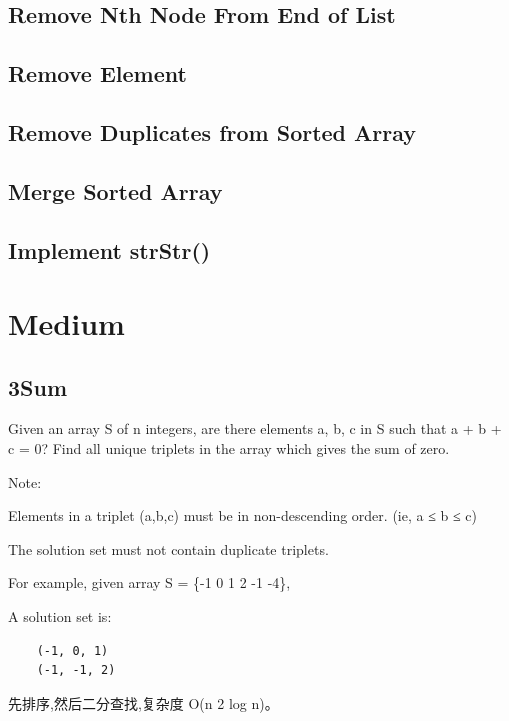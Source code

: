 \documentclass[12pt]{book}
\begin{document}
\subsection{Remove Nth Node From End of List}
\label{sec-15-1-2}
\subsection{Remove Element}
\label{sec-15-1-3}
\subsection{Remove Duplicates from Sorted Array}
\label{sec-15-1-4}
\subsection{Merge Sorted Array}
\label{sec-15-1-5}
\subsection{Implement strStr()}
\label{sec-15-1-6}
\section{Medium}
\label{sec-15-2}
\subsection{3Sum}
\label{sec-15-2-1}
Given an array S of n integers, are there elements a, b, c in S such that a + b + c = 0? Find all unique triplets in the array which gives the sum of zero.

Note:

Elements in a triplet (a,b,c) must be in non-descending order. (ie, a ≤ b ≤ c)

The solution set must not contain duplicate triplets.

For example, given array S = \{-1 0 1 2 -1 -4\},

A solution set is:
\lstset{language=java,label= ,caption= ,numbers=none}
\begin{lstlisting}
    (-1, 0, 1)
    (-1, -1, 2)
\end{lstlisting}

先排序,然后二分查找,复杂度 O(n 2 log n)。
\end{document}
